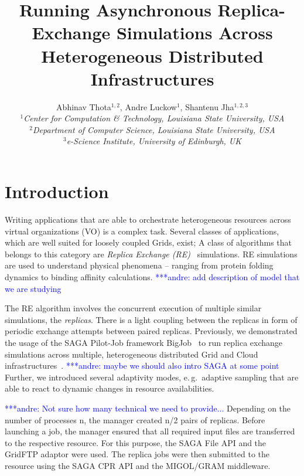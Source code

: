 \documentclass[a4paper,10pt]{article}
\newcommand{\alnote}[1]{ {\textcolor{blue} { ***andre: #1 }}}
\newcommand{\alnote}[1]{}
\begin{document}
\title{\LARGE Running Asynchronous Replica-Exchange Simulations Across Heterogeneous Distributed Infrastructures}
 
\author{Abhinav Thota$^{1,2}$, Andre Luckow$^{1}$, Shantenu Jha$^{1,2,3}$\\
   \small{\emph{$^{1}$Center for Computation \& Technology, Louisiana State University, USA}}\\
   \small{\emph{$^{2}$Department of Computer Science, Louisiana State University, USA}}\\
   \small{\emph{$^{3}$e-Science Institute, University of Edinburgh, UK}}
   }
 
\maketitle

\section{Introduction}
 
Writing applications that are able to orchestrate heterogeneous
resources across virtual organizations (VO) is a complex task.  Several 
classes of applications, which are well suited for loosely
coupled Grids, exist; A class of algorithms that belongs to this category are
\emph{Replica Exchange (RE)}~\cite{hansmann,Sugita:1999rm} simulations. 
RE simulations are used to understand physical phenomena -- ranging from protein 
folding dynamics to binding affinity calculations.
\alnote{add description of model that we are studying}

The RE algorithm involves the concurrent execution of multiple similar simulations, the \emph{replicas}.
There is a light coupling between the replicas in form of periodic exchange attempts between
paired replicas. Previously, we demonstrated the usage of the SAGA Pilot-Job framework 
BigJob~\cite{saga_bigjob_condor_cloud} to run replica exchange simulations across multiple, 
heterogeneous distributed Grid and Cloud infrastructures~\cite{Luckow:2008fp}. 
\alnote{maybe we should also intro SAGA at some point}
Further, we introduced several adaptivity modes, e.\,g.\ adaptive sampling that 
are able to react to dynamic changes in resource availabilities.

\alnote{Not sure how many technical we need to provide...}
Depending on the number of processes n, the manager created n/2 pairs of replicas. 
Before launching a job, the manager ensured that all required input files are transferred to the respective
resource. For this purpose, the SAGA File API and the GridFTP adaptor were
used. The replica jobs were then submitted to the resource using the SAGA CPR
API and the MIGOL/GRAM middleware.
\end{document}
